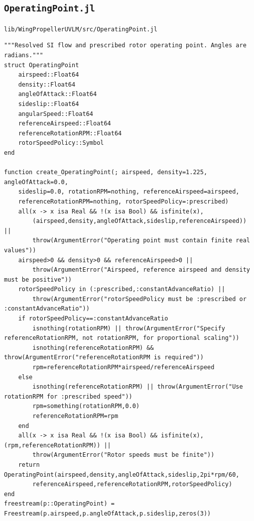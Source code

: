 \documentclass[11pt,a4paper]{article}
\newcommand{\code}{\nolinkurl}
\begin{document}
\subsection{\texorpdfstring{\code{OperatingPoint.jl}}{OperatingPoint.jl}}
\code{lib/WingPropellerUVLM/src/OperatingPoint.jl}
\begin{lstlisting}
"""Resolved SI flow and prescribed rotor operating point. Angles are radians."""
struct OperatingPoint
    airspeed::Float64
    density::Float64
    angleOfAttack::Float64
    sideslip::Float64
    angularSpeed::Float64
    referenceAirspeed::Float64
    referenceRotationRPM::Float64
    rotorSpeedPolicy::Symbol
end

function create_OperatingPoint(; airspeed, density=1.225, angleOfAttack=0.0,
    sideslip=0.0, rotationRPM=nothing, referenceAirspeed=airspeed,
    referenceRotationRPM=nothing, rotorSpeedPolicy=:prescribed)
    all(x -> x isa Real && !(x isa Bool) && isfinite(x),
        (airspeed,density,angleOfAttack,sideslip,referenceAirspeed)) ||
        throw(ArgumentError("Operating point must contain finite real values"))
    airspeed>0 && density>0 && referenceAirspeed>0 ||
        throw(ArgumentError("Airspeed, reference airspeed and density must be positive"))
    rotorSpeedPolicy in (:prescribed,:constantAdvanceRatio) ||
        throw(ArgumentError("rotorSpeedPolicy must be :prescribed or :constantAdvanceRatio"))
    if rotorSpeedPolicy==:constantAdvanceRatio
        isnothing(rotationRPM) || throw(ArgumentError("Specify referenceRotationRPM, not rotationRPM, for proportional scaling"))
        isnothing(referenceRotationRPM) && throw(ArgumentError("referenceRotationRPM is required"))
        rpm=referenceRotationRPM*airspeed/referenceAirspeed
    else
        isnothing(referenceRotationRPM) || throw(ArgumentError("Use rotationRPM for :prescribed speed"))
        rpm=something(rotationRPM,0.0)
        referenceRotationRPM=rpm
    end
    all(x -> x isa Real && !(x isa Bool) && isfinite(x),(rpm,referenceRotationRPM)) ||
        throw(ArgumentError("Rotor speeds must be finite"))
    return OperatingPoint(airspeed,density,angleOfAttack,sideslip,2pi*rpm/60,
        referenceAirspeed,referenceRotationRPM,rotorSpeedPolicy)
end
freestream(p::OperatingPoint) = Freestream(p.airspeed,p.angleOfAttack,p.sideslip,zeros(3))


\end{lstlisting}
\end{document}
